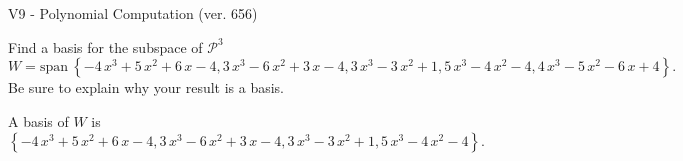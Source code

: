 \begin{exercise}
  \begin{exerciseTitle}V9 - Polynomial Computation (ver. 656)\end{exerciseTitle}
  \begin{exerciseStatement}
    Find a basis for the subspace of \(\mathcal{P}^3\) 
\[W=\mathrm{span}\ \left\{-4 \, x^{3} + 5 \, x^{2} + 6 \, x - 4 , 3 \, x^{3} - 6 \, x^{2} + 3 \, x - 4 , 3 \, x^{3} - 3 \, x^{2} + 1 , 5 \, x^{3} - 4 \, x^{2} - 4 , 4 \, x^{3} - 5 \, x^{2} - 6 \, x + 4\right\}.\]
 Be sure to explain why your result is a basis.


  \end{exerciseStatement}
  \begin{exerciseAnswer}
   A basis of \(W\) is  \(\left\{-4 \, x^{3} + 5 \, x^{2} + 6 \, x - 4 , 3 \, x^{3} - 6 \, x^{2} + 3 \, x - 4 , 3 \, x^{3} - 3 \, x^{2} + 1 , 5 \, x^{3} - 4 \, x^{2} - 4\right\}\).
  


  \end{exerciseAnswer}
\end{exercise}